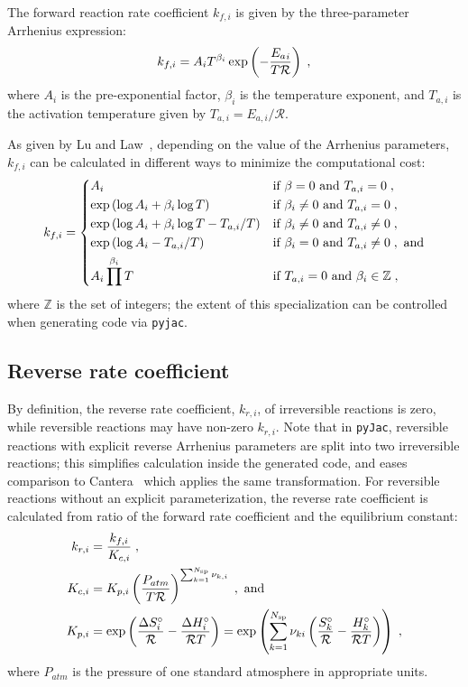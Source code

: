 \documentclass[12pt,number,sort&compress]{elsarticle}
\begin{document}
The forward reaction rate coefficient $k_{f, i}$ is given by the three-parameter Arrhenius expression:
\begin{equation}
  \label{e:arrhenius}
  {k_{f, i}} = A_{i} T^{\beta_{i}} \operatorname{exp}\left({- \frac{{E_{a}}_{i}}{T \Ru/}}\right) \;,
\end{equation}
where $A_i$ is the pre-exponential factor, $\beta_i$ is the temperature exponent, and $T_{a, i}$ is the activation temperature given by $T_{a, i} = E_{a, i} / \mathcal{R}$.

As given by Lu and Law~\cite{Lu:2009gh}, depending on the value of the Arrhenius parameters, $k_{f,i}$ can be calculated in different ways to minimize the computational cost:
\begin{equation}
  k_{f,i} =
  \begin{dcases}
  A_i & \text{if } \beta = 0 \text{ and } T_{a,i} = 0 \;, \\
  \exp \left( \log A_i + \beta_i \log T \right)   & \text{if } \beta_i \neq 0 \text{ and } T_{a, i} = 0 \;, \\
  \exp \left( \log A_i + \beta_i \log T - T_{a, i} / T \right) & \text{if } \beta_i \neq 0 \text{ and } T_{a, i} \neq 0 \;, \\
  \exp \left( \log A_i - T_{a, i} / T \right)  & \text{if } \beta_i = 0 \text{ and } T_{a, i} \neq 0 \;, \text{ and} \\
  A_i \prod^{\beta_i} T & \text{if } T_{a, i} = 0 \text{ and } \beta_i \in \mathbb{Z} \;,
  \end{dcases}
\end{equation}
where $\mathbb{Z}$ is the set of integers; the extent of this specialization can be controlled when generating code via \texttt{pyjac}.

\subsection{Reverse rate coefficient}
By definition, the reverse rate coefficient, ${k_{r, i}}$, of irreversible reactions is zero, while reversible reactions may have non-zero ${k_{r, i}}$.
Note that in \texttt{pyJac}, reversible reactions with explicit reverse Arrhenius parameters are split into two irreversible reactions; this simplifies calculation inside the generated code, and eases comparison to Cantera~\cite{Goodwin:2015aa} which applies the same transformation.
For reversible reactions without an explicit parameterization, the reverse rate coefficient is calculated from ratio of the forward rate coefficient and the equilibrium constant:
\begin{align}
 {k_{r, i}} &= \frac{{k_{f, i}}}{{K_{c, i}}}\; , \label{e:kr}\\
 {K_{c, i}} &= {K_{p,i}}\left(\frac{P_{atm}}{T \Ru/}\right)^{\sum_{k=1}^{\ns/} \nu_{k,i}} \; ,\text{ and} \label{e:kc}\\
 {K_{p,i}} &= \text{exp}\left(\frac{\Delta S^{\circ}_i}{\Ru/} - \frac{\Delta H^{\circ}_i}{\Ru/ T}\right) = \text{exp}\left(\sum_{k=1}^{\ns/}\nu_{ki}\left(\frac{S^{\circ}_k}{\Ru/} - \frac{H^{\circ}_k}{\Ru/ T}\right)\right) \;, \label{e:kp}
\end{align}
where $P_{atm}$ is the pressure of one standard atmosphere in appropriate units.
\end{document}
